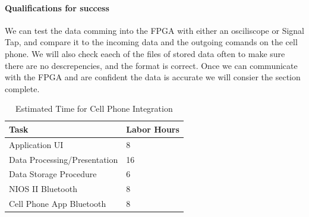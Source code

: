 \documentclass[12pt,article]{IEEEtran}
\begin{document}
        \paragraph{\bfseries Qualifications for success}
            We can test the data comming into the FPGA with either an osciliscope or Signal Tap, and compare it to the 
            incoming data and the outgoing comands on the cell phone. We will also check eaech of the files of stored 
            data often to make sure there are no descrepencies, and the format is correct. Once we can communicate with
            the FPGA and are confident the data is accurate we will consier the section complete.
            
        \begin{table}[H]        
            \renewcommand{\arraystretch}{1.3}
                \caption{Estimated Time for Cell Phone Integration}
                
                \label{Estimated Time}
                
                \centering
                \begin{tabular}{p{5.5cm}|p{2cm}}
                \hline
                \bfseries   Task                            & \bfseries Labor Hours                     \\
                \hline\hline
                            Application UI                  & 8                                         \\
                            Data Processing/Presentation    & 16                                         \\
                            Data Storage Procedure          & 6                                         \\  
                            NIOS II Bluetooth               & 8                                         \\  
                            Cell Phone App Bluetooth        & 8                                         \\
                            \hline                          
                \end{tabular}
        \end{table}

\end{document}
